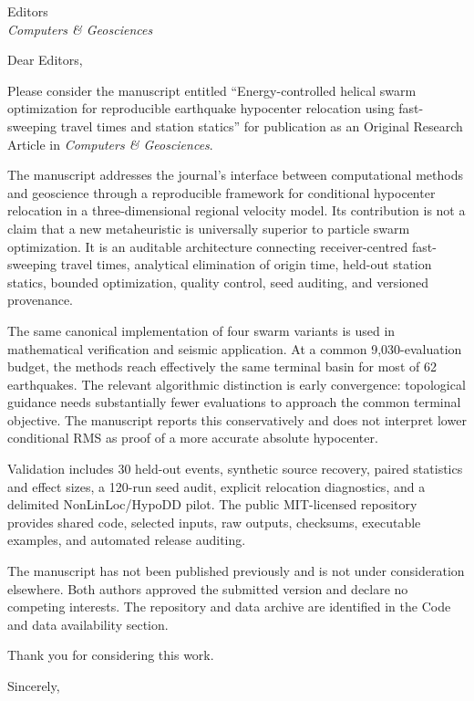 \documentclass[10pt]{letter}
\date{\today}
\begin{document}
\begin{letter}{Editors\\\textit{Computers \& Geosciences}}
\opening{Dear Editors,}

Please consider the manuscript entitled ``Energy-controlled helical swarm optimization for reproducible earthquake hypocenter relocation using fast-sweeping travel times and station statics'' for publication as an Original Research Article in \textit{Computers \& Geosciences}.

The manuscript addresses the journal's interface between computational methods and geoscience through a reproducible framework for conditional hypocenter relocation in a three-dimensional regional velocity model. Its contribution is not a claim that a new metaheuristic is universally superior to particle swarm optimization. It is an auditable architecture connecting receiver-centred fast-sweeping travel times, analytical elimination of origin time, held-out station statics, bounded optimization, quality control, seed auditing, and versioned provenance.

The same canonical implementation of four swarm variants is used in mathematical verification and seismic application. At a common 9,030-evaluation budget, the methods reach effectively the same terminal basin for most of 62 earthquakes. The relevant algorithmic distinction is early convergence: topological guidance needs substantially fewer evaluations to approach the common terminal objective. The manuscript reports this conservatively and does not interpret lower conditional RMS as proof of a more accurate absolute hypocenter.

Validation includes 30 held-out events, synthetic source recovery, paired statistics and effect sizes, a 120-run seed audit, explicit relocation diagnostics, and a delimited NonLinLoc/HypoDD pilot. The public MIT-licensed repository provides shared code, selected inputs, raw outputs, checksums, executable examples, and automated release auditing.

The manuscript has not been published previously and is not under consideration elsewhere. Both authors approved the submitted version and declare no competing interests. The repository and data archive are identified in the Code and data availability section.

Thank you for considering this work.

\closing{Sincerely,}
\end{letter}
\end{document}
